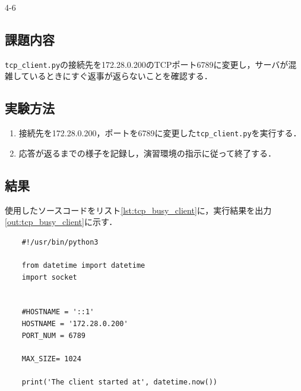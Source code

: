 \begin{maintask}{4-6}

  \subsection*{課題内容}
  \texttt{tcp\_client.py}の接続先を172.28.0.200のTCPポート6789に変更し，サーバが混雑しているときにすぐ返事が返らないことを確認する．

  \subsection*{実験方法}
  \begin{enumerate}
    \item 接続先を172.28.0.200，ポートを6789に変更した\texttt{tcp\_client.py}を実行する．
    \item 応答が返るまでの様子を記録し，演習環境の指示に従って終了する．
  \end{enumerate}

  \subsection*{結果}
  使用したソースコードをリスト\ref{lst:tcp_busy_client}に，実行結果を出力\ref{out:tcp_busy_client}に示す．
  \begin{listing}[H]
    \caption{混雑時の確認に用いたtcp\_client.py}\label{lst:tcp_busy_client}
    \begin{verbatim}
    #!/usr/bin/python3

    from datetime import datetime
    import socket
                                                                                                              
                                                                                                              
    #HOSTNAME = '::1'
    HOSTNAME = '172.28.0.200'
    PORT_NUM = 6789
                                                                                                              
    MAX_SIZE= 1024
                                                                                                              
    print('The client started at', datetime.now())
                                                                                                              

\end{verbatim}
\end{listing}
\end{maintask}

